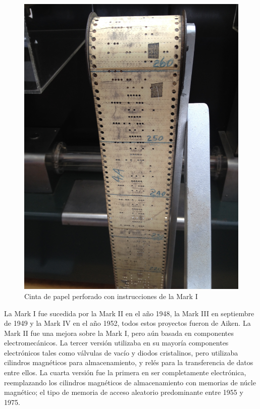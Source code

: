 \begin{figure}
  \centering
  \includegraphics[scale=0.05]{./figures/C02-mark_i_instruction_tape}
  \captionsetup{justification=centering}
  \caption{Cinta de papel perforado con instrucciones de la Mark I}
  \label{fig:C02-mark_i_instruction_tape}
\end{figure}
La Mark I fue sucedida por la Mark II en el año 1948, la Mark III en septiembre de 1949 y la Mark IV en el año 1952, todos estos proyectos fueron de Aiken. La Mark II fue una mejora sobre la Mark I, pero aún basada en componentes electromecánicos. La tercer versión utilizaba en su mayoría componentes electrónicos tales como válvulas de vacío y diodos cristalinos, pero utilizaba cilindros magnéticos para almacenamiento, y relés para la transferencia de datos entre ellos. La cuarta versión fue la primera en ser completamente electrónica, reemplazando los cilindros magnéticos de almacenamiento con memorias de núcle magnético; el tipo de memoria de acceso aleatorio predominante entre 1955 y 1975.

